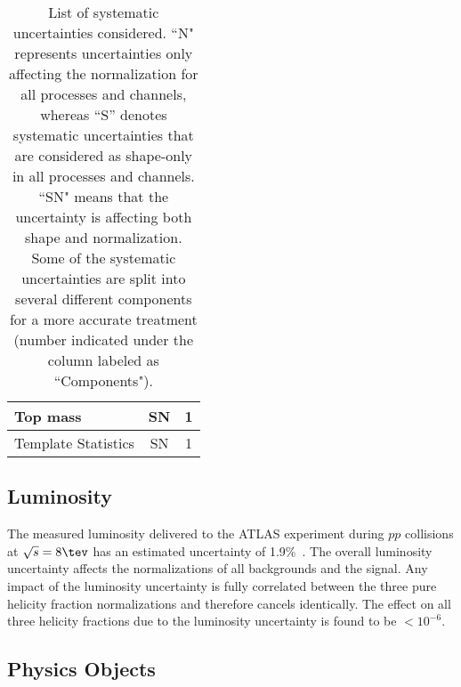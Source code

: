 \begin{table}[h!]
\begin{tabular}{lcc}
Top mass           & SN & 1 \\ \hline\hline
Template Statistics & SN & 1 \\
\hline\hline
\end{tabular}
\caption{\label{tab:SystSummary} List of systematic uncertainties considered.
``N" represents uncertainties only affecting the normalization for all processes and channels, whereas ``S'' denotes systematic uncertainties that are considered as shape-only in all processes and
channels.  ``SN" means that the uncertainty is affecting both shape and normalization.
Some of the systematic uncertainties are split into several different components for a more
accurate treatment (number indicated under the column labeled as ``Components").
}
\end{table}

\subsection{Luminosity}
\label{sec:syst_lumi}
The measured luminosity delivered to the ATLAS experiment during $pp$ collisions at $\sqrt{s}=8\tev$ has an estimated uncertainty of 1.9\%~\cite{lumi_8TeV}. The overall luminosity uncertainty affects the normalizations of all backgrounds and the \ttbar signal. Any impact of the luminosity uncertainty is fully correlated between the three pure helicity fraction normalizations and therefore cancels identically. The effect on all three helicity fractions due to the luminosity uncertainty is found to be $<10^{-6}$.

\subsection{Physics Objects}
\label{sec:syst_objects}

